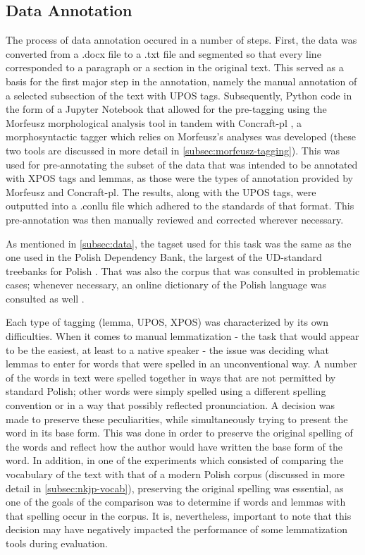 \subsection{Data Annotation}
\label{subsec:annotation}

The process of data annotation occured in a number of steps. First, the data was converted from a .docx file to a .txt file and segmented so that every line corresponded to a paragraph or a section in the original text. This served as a basis for the first major step in the annotation, namely the manual annotation of a selected subsection of the text with UPOS tags. Subsequently, Python code in the form of a Jupyter Notebook that allowed for the pre-tagging using the Morfeusz morphological analysis tool \citep{kie:wol:17:morf} in tandem with Concraft-pl \citep{waszczuk-2012-harnessing, waszczuk2018morphosyntactic}, a morphosyntactic tagger which relies on Morfeusz's analyses was developed (these two tools are discussed in more detail in \autoref{subsec:morfeusz-tagging}). This was used for pre-annotating the subset of the data that was intended to be annotated with XPOS tags and lemmas, as those were the types of annotation provided by Morfeusz and Concraft-pl. The results, along with the UPOS tags, were outputted into a .conllu file which adhered to the standards of that format. This pre-annotation was then manually reviewed and corrected wherever necessary.

As mentioned in \autoref{subsec:data}, the tagset used for this task was the same as the one used in the Polish Dependency Bank, the largest of the UD-standard treebanks for Polish \citep{wroblewska-2018-extended}. That was also the corpus that was consulted in problematic cases; whenever necessary, an online dictionary of the Polish language was consulted as well \citep{pwn_n.d.}.

Each type of tagging (lemma, UPOS, XPOS) was characterized by its own difficulties. When it comes to manual lemmatization - the task that would appear to be the easiest, at least to a native speaker - the issue was deciding what lemmas to enter for words that were spelled in an unconventional way. A number of the words in text were spelled together in ways that are not permitted by standard Polish; other words were simply spelled using a different spelling convention or in a way that possibly reflected pronunciation. A decision was made to preserve these peculiarities, while simultaneously trying to present the word in its base form. This was done in order to preserve the original spelling of the words and reflect how the author would have written the base form of the word. In addition, in one of the experiments which consisted of comparing the vocabulary of the text with that of a modern Polish corpus (discussed in more detail in \autoref{subsec:nkjp-vocab}), preserving the original spelling was essential, as one of the goals of the comparison was to determine if words and lemmas with that spelling occur in the corpus. It is, nevertheless, important to note that this decision may have negatively impacted the performance of some lemmatization tools during evaluation. 

